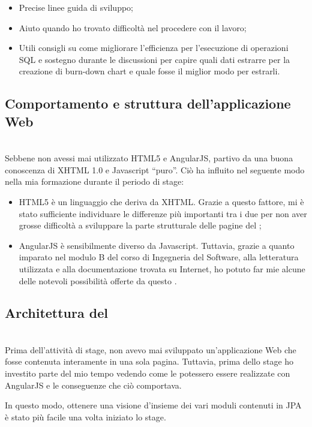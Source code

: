\begin{itemize}
\item Precise linee guida di sviluppo;
\item Aiuto quando ho trovato difficoltà nel procedere con il lavoro;
\item Utili consigli su come migliorare l'efficienza per l'esecuzione di
  operazioni SQL e sostegno durante le discussioni per capire quali dati
  estrarre per la creazione di burn-down chart e quale fosse il miglior modo
  per estrarli.
\end{itemize}

\subsection{Comportamento e struttura dell'applicazione Web} \mbox{} \\

Sebbene non avessi mai utilizzato HTML5 e AngularJS, partivo da una buona
conoscenza di XHTML 1.0 e Javascript ``puro''. Ciò ha influito nel seguente
modo nella mia formazione durante il periodo di stage:

\begin{itemize}
\item HTML5 è un linguaggio che deriva da XHTML. Grazie a questo fattore, mi
  è stato sufficiente individuare le differenze più importanti tra i due per
  non aver grosse difficoltà a sviluppare la parte strutturale delle pagine
  del \FREND;
\item AngularJS è sensibilmente diverso da Javascript. Tuttavia, grazie
  a quanto imparato nel modulo B del corso di Ingegneria del Software, alla
  letteratura utilizzata e alla documentazione trovata su Internet, ho potuto
  far mie alcune delle notevoli possibilità offerte da questo
  .
\end{itemize}

\subsection{Architettura del \FREND{}} \mbox{} \\

Prima dell'attività di stage, non avevo mai sviluppato un'applicazione Web che
fosse contenuta interamente in una sola pagina. Tuttavia, prima dello stage ho
investito parte del mio tempo vedendo come le  potessero essere
realizzate con AngularJS e le conseguenze che ciò comportava.

In questo modo, ottenere una visione d'insieme dei vari moduli contenuti in
JPA è stato più facile una volta iniziato lo stage.

